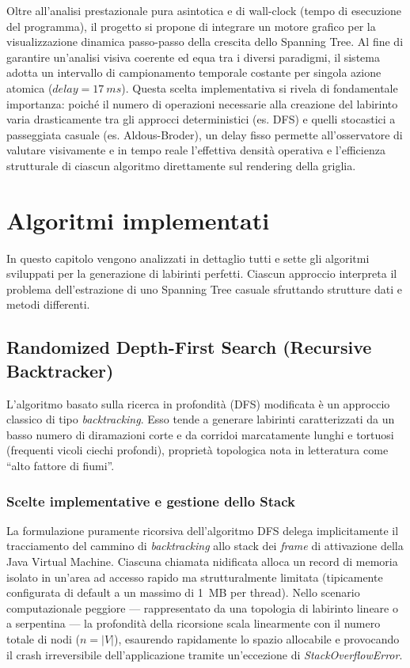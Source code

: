 \documentclass[12pt, a4paper]{article}
\begin{document}
	Oltre all'analisi prestazionale pura asintotica e di wall-clock (tempo di esecuzione del programma), il progetto si propone di integrare un motore grafico per la visualizzazione dinamica passo-passo della crescita dello Spanning Tree. Al fine di garantire un'analisi visiva coerente ed equa tra i diversi paradigmi, il sistema adotta un intervallo di campionamento temporale costante per singola azione atomica ($delay = 17\ ms$). Questa scelta implementativa si rivela di fondamentale importanza: poiché il numero di operazioni necessarie alla creazione del labirinto varia drasticamente tra gli approcci deterministici (es. DFS) e quelli stocastici a passeggiata casuale (es. Aldous-Broder), un delay fisso permette all'osservatore di valutare visivamente e in tempo reale l'effettiva densità operativa e l'efficienza strutturale di ciascun algoritmo direttamente sul rendering della griglia.
	
	\section{Algoritmi implementati}
	In questo capitolo vengono analizzati in dettaglio tutti e sette gli algoritmi sviluppati per la generazione di labirinti perfetti. Ciascun approccio interpreta il problema dell'estrazione di uno Spanning Tree casuale sfruttando strutture dati e metodi differenti.
	
	\subsection{Randomized Depth-First Search (Recursive Backtracker)}
	L'algoritmo basato sulla ricerca in profondità (DFS) modificata è un approccio classico di tipo \textit{backtracking}. Esso tende a generare labirinti caratterizzati da un basso numero di diramazioni corte e da corridoi marcatamente lunghi e tortuosi (frequenti vicoli ciechi profondi), proprietà topologica nota in letteratura come ``alto fattore di fiumi''.
	
	\subsubsection{Scelte implementative e gestione dello Stack}
	La formulazione puramente ricorsiva dell'algoritmo DFS delega implicitamente il tracciamento del cammino di \textit{backtracking} allo stack dei \textit{frame} di attivazione della Java Virtual Machine. Ciascuna chiamata nidificata alloca un record di memoria isolato in un'area ad accesso rapido ma strutturalmente limitata (tipicamente configurata di default a un massimo di 1~MB per thread). Nello scenario computazionale peggiore --- rappresentato da una topologia di labirinto lineare o a serpentina --- la profondità della ricorsione scala linearmente con il numero totale di nodi ($n = |V|$), esaurendo rapidamente lo spazio allocabile e provocando il crash irreversibile dell'applicazione tramite un'eccezione di \textit{StackOverflowError}.
	
\end{document}
